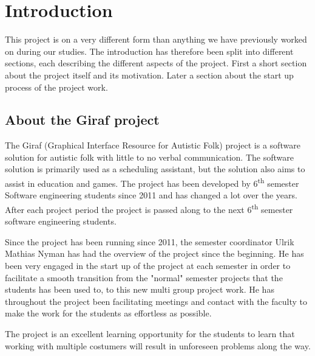 
\chapter{Introduction}
This project is on a very different form than anything we have previously worked on during our studies.
The introduction has therefore been split into different sections, each describing the different aspects of the project.
First a short section about the project itself and its motivation.
Later a section about the start up process of the project work.

\section{About the Giraf project}
The Giraf (Graphical Interface Resource for Autistic Folk) project is a software solution for autistic folk with little to no verbal communication.
The software solution is primarily used as a scheduling assistant, but the solution also aims to assist in education and games.
The project has been developed by 6\textsuperscript{th} semester Software engineering students since 2011 and has changed a lot over the years.
After each project period the project is passed along to the next 6\textsuperscript{th} semester software engineering students.

Since the project has been running since 2011, the semester coordinator Ulrik Mathias Nyman  has had the overview of the project since the beginning.
He has been very engaged in the start up of the project at each semester in order to facilitate a smooth transition from the "normal" semester projects that the students has been used to, to this new multi group project work.
He has throughout the project been facilitating meetings and contact with the faculty to make the work for the students as effortless as possible.

The project is an excellent learning opportunity for the students to learn that working with multiple costumers will result in unforeseen problems along the way.

